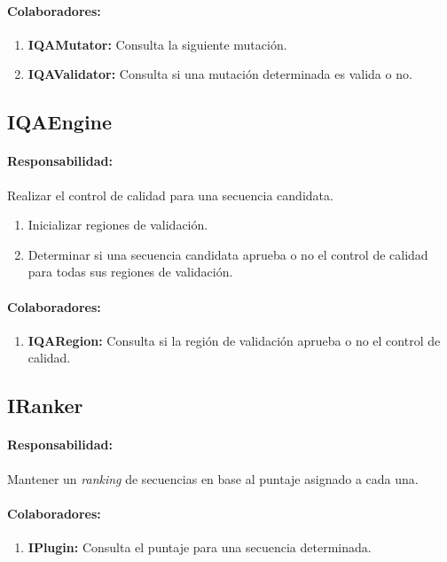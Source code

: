 \documentclass[a4paper,10pt]{article}
\begin{document}
    \paragraph{Colaboradores:}
      \begin{enumerate}
       \item \textbf{IQAMutator:} Consulta la siguiente mutaci\'on.
       \item \textbf{IQAValidator:} Consulta si una mutaci\'on determinada es
valida o no.
      \end{enumerate}

  \subsection{IQAEngine}
    \paragraph{Responsabilidad:} Realizar el control de calidad para una
secuencia candidata.
      \begin{enumerate}       
       \item Inicializar regiones de validaci\'on.
       \item Determinar si una secuencia candidata aprueba o no el control de
calidad para todas sus regiones de validaci\'on.
      \end{enumerate}
    \paragraph{Colaboradores:}
      \begin{enumerate}
       \item \textbf{IQARegion:} Consulta si la regi\'on de validaci\'on aprueba
o no el control de calidad.
      \end{enumerate}

  \subsection{IRanker}
    \paragraph{Responsabilidad:} Mantener un \textit{ranking} de secuencias en
base al puntaje asignado a cada una.       
    \paragraph{Colaboradores:}
      \begin{enumerate}
       \item \textbf{IPlugin:} Consulta el puntaje para una secuencia
determinada.
      \end{enumerate}
\end{document}
